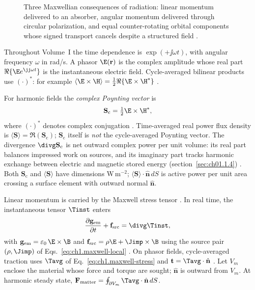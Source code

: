 \begin{figure}[t]
\centering
\VolIPhysFig{\VolIPhysThreeRadiationConsequences}
\caption{Three Maxwellian consequences of radiation: linear momentum delivered to an absorber, angular momentum delivered through circular polarization, and equal counter-rotating orbital components whose signed transport cancels despite a structured field \cite{poynting1884,beth1936,allen1992}.}
\label{fig:ch1.three-radiation-consequences}
\end{figure}

Throughout Volume~I the time dependence is $\exp(+\jj\omega t)$, with angular frequency
$\omega$ in rad/s. A phasor $\E(\mathbf{r})$ is the complex amplitude whose real part
$\Re\{\E e^{\jj\omega t}\}$ is the instantaneous electric field. Cycle-averaged bilinear products use $(\cdot)^*$: for example $\langle\E\times\H\rangle=\tfrac12\Re\{\E\times\H^*\}$
\cite{stratton1941,harrington2001}.

For harmonic fields the \emph{complex Poynting vector} is
\begin{equation}
\label{eq:ch1.intro-poynting}
\mathbf{S}_\mathrm{c}=\tfrac{1}{2}\E\times\H^*,
\end{equation}
where $(\cdot)^*$ denotes complex conjugation \cite{poynting1884,stratton1941}.
Time-averaged real power flux density is $\langle\mathbf{S}\rangle=\Re(\mathbf{S}_\mathrm{c})$;
$\mathbf{S}_\mathrm{c}$ itself is \emph{not} the cycle-averaged Poynting vector.
The divergence $\divg\mathbf{S}_\mathrm{c}$ is net outward complex power per unit volume:
its real part balances impressed work on sources, and its imaginary part tracks harmonic
exchange between electric and magnetic stored energy (section~\ref{sec:ch01.1.4})
\cite{stratton1941}. Both $\mathbf{S}_\mathrm{c}$ and $\langle\mathbf{S}\rangle$ have
dimensions W\,m$^{-2}$; $\langle\mathbf{S}\rangle\cdot\hat{\mathbf{n}}\,dS$ is active
power per unit area crossing a surface element with outward normal $\hat{\mathbf{n}}$.

Linear momentum is carried by the Maxwell stress tensor \cite{maxwell1873,stratton1941}. In real time, the instantaneous tensor $\Tinst$ enters
\begin{equation}
\label{eq:ch1.intro-momentum-balance}
\frac{\partial\mathbf{g}_{\mathrm{em}}}{\partial t}+\mathbf{f}_{\mathrm{src}}
=\divg\Tinst,
\end{equation}
with $\mathbf{g}_{\mathrm{em}}=\varepsilon_0\,\E\times\B$ and $\mathbf{f}_{\mathrm{src}}=\rho\E+\Jimp\times\B$ using the source pair $(\rho,\Jimp)$ of Eqs.~\eqref{eq:ch1.maxwell-local} \cite{maxwell1873,stratton1941}. On phasor fields, cycle-averaged traction uses $\Tavg$ of Eq.~\eqref{eq:ch1.maxwell-stress} and $\mathbf{t}=\Tavg\cdot\hat{\mathbf{n}}$ \cite{stratton1941}. Let $V_m$ enclose the material whose force and torque are sought; $\hat{\mathbf{n}}$ is outward from $V_m$. At harmonic steady state, $\mathbf{F}_{\mathrm{matter}}=\oint_{\partial V_m}\Tavg\cdot\hat{\mathbf{n}}\,dS$.

